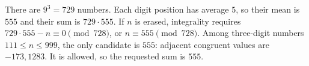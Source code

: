 There are $9^3=729$ numbers. Each digit position has average $5$, so their mean is $555$ and their sum is $729\cdot555$. If $n$ is erased, integrality requires $729\cdot555-n\equiv0\pmod{728}$, or $n\equiv555\pmod{728}$. Among three-digit numbers $111\le n\le999$, the only candidate is $555$: adjacent congruent values are $-173,1283$. It is allowed, so the requested sum is $\boxed{555}$.
